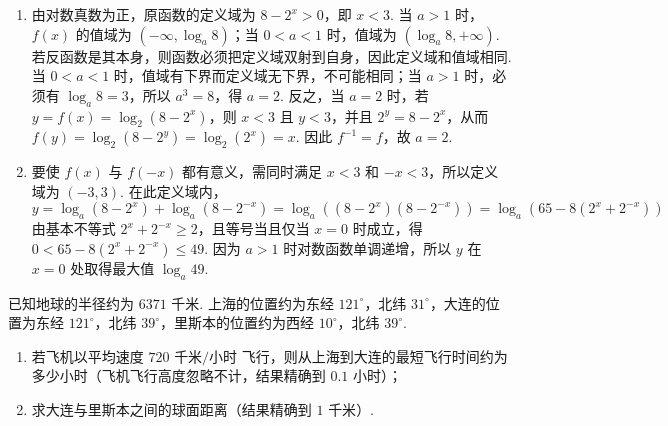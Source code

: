 \begin{solution}
\begin{enumerate}
\item 由对数真数为正，原函数的定义域为 \(8-2^x>0\)，即 \(x<3\). 当 \(a>1\) 时，\(f(x)\) 的值域为 \((-\infty,\log_a8)\)；当 \(0<a<1\) 时，值域为 \((\log_a8,+\infty)\). 若反函数是其本身，则函数必须把定义域双射到自身，因此定义域和值域相同. 当 \(0<a<1\) 时，值域有下界而定义域无下界，不可能相同；当 \(a>1\) 时，必须有 \(\log_a8=3\)，所以 \(a^3=8\)，得 \(a=2\). 反之，当 \(a=2\) 时，若 \(y=f(x)=\log_2(8-2^x)\)，则 \(x<3\) 且 \(y<3\)，并且 \(2^y=8-2^x\)，从而 \(f(y)=\log_2(8-2^y)=\log_2(2^x)=x\). 因此 \(f^{-1}=f\)，故 \(a=2\).

\item 要使 \(f(x)\) 与 \(f(-x)\) 都有意义，需同时满足 \(x<3\) 和 \(-x<3\)，所以定义域为 \((-3,3)\). 在此定义域内，
\[
y=\log_a(8-2^x)+\log_a(8-2^{-x})=\log_a\left((8-2^x)(8-2^{-x})\right)=\log_a\left(65-8(2^x+2^{-x})\right)
\]
由基本不等式 \(2^x+2^{-x}\geq2\)，且等号当且仅当 \(x=0\) 时成立，得 \(0<65-8(2^x+2^{-x})\leq49\). 因为 \(a>1\) 时对数函数单调递增，所以 \(y\) 在 \(x=0\) 处取得最大值 \(\log_a49\).
\end{enumerate}
\end{solution}

\begin{problem}
已知地球的半径约为 \(6371\text{ 千米}\). 上海的位置约为东经 \(121^\circ\)，北纬 \(31^\circ\)，大连的位置为东经 \(121^\circ\)，北纬 \(39^\circ\)，里斯本的位置约为西经 \(10^\circ\)，北纬 \(39^\circ\).

\begin{enumerate}
\item 若飞机以平均速度 \(720\text{ 千米/小时}\) 飞行，则从上海到大连的最短飞行时间约为多少小时（飞机飞行高度忽略不计，结果精确到 \(0.1\text{ 小时}\)）；
\item 求大连与里斯本之间的球面距离（结果精确到 \(1\text{ 千米}\)）.
\end{enumerate}

\end{problem}

